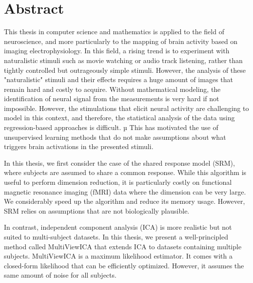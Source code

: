 \begingroup
\let\clearpage\relax
\let\cleardoublepage\relax
\let\cleardoublepage\relax

\chapter*{Abstract}
This thesis in computer science and mathematics is applied to the field of
neuroscience, and more particularly to the mapping of brain activity based on imaging electrophysiology.
%
In this field, a rising trend is to experiment with naturalistic stimuli such as movie watching or audio track listening,
rather than tightly controlled but outrageously simple stimuli.
However, the analysis of these "naturalistic" stimuli and their effects requires a huge amount of images that remain hard and costly to acquire.
%
Without mathematical modeling, the
identification of neural signal from the measurements is very hard if not impossible.
%
However, the stimulations that elicit neural activity are challenging to model in this context, and therefore, the statistical analysis of the data using regression-based approaches is difficult.
µ
This has motivated the use of unsupervised learning methods that do not make assumptions about what triggers brain activations in the presented stimuli.

In this thesis, we first consider the case of the shared response model (SRM), where
subjects are assumed to share a common response. While this algorithm is useful
to perform dimension reduction, it is particularly costly on functional magnetic
resonance imaging (fMRI) data where the
dimension can be very large. We considerably speed up the
algorithm and reduce its memory usage. However, SRM relies on assumptions that
are not biologically plausible.

In contrast, independent component analysis (ICA) is more realistic but not suited to multi-subject datasets. In this thesis, we present a well-principled method called MultiViewICA that extends ICA to datasets containing multiple subjects.
MultiViewICA is a maximum likelihood estimator. It comes with a closed-form
likelihood that can be efficiently optimized. However, it assumes the same amount of noise for all subjects.

